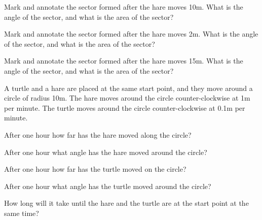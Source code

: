 \begin{problem}
\begin{subproblem}
  \item Mark and annotate the sector formed after the hare moves
    10m. What is the angle of the sector, and what is the area of the
    sector?
    \vfill

  \item Mark and annotate the sector formed after the hare moves
    2m. What is the angle of the sector, and what is the area of the
    sector?
    \vfill
  \item Mark and annotate the sector formed after the hare moves
    15m. What is the angle of the sector, and what is the area of the
    sector?
    \vfill
  \end{subproblem}

\clearpage

\item A turtle and a hare are placed at the same start point, and they
  move around a circle of radius 10m. The hare moves around the circle
  counter-clockwise at 1m per minute. The turtle moves around the
  circle counter-clockwise at 0.1m per minute.
  \begin{subproblem}
  \item After one hour how far has the hare moved along the circle?
    \vfill

  \item After one hour what angle has the hare moved around the circle?
    \vfill

  \item After one hour how far has the turtle moved on the circle?
    \vfill

  \item After one hour what angle has the turtle moved around the circle?
    \vfill

  \item How long will it take until the hare and the turtle are at the
    start point at the same time?
    \vfill
  \end{subproblem}


\end{problem}

\postClass

